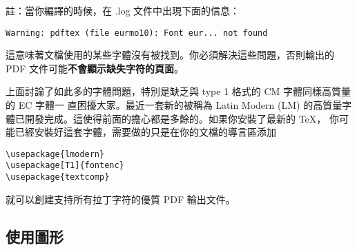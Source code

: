 註：當你編譯的時候，在 .log 文件中出現下面的信息：
\begin{verbatim}
Warning: pdftex (file eurmo10): Font eur... not found
\end{verbatim}
這意味著文檔使用的某些字體沒有被找到。你必須解決這些問題，否則輸出的 PDF 
文件可能\textbf{不會顯示缺失字符的頁面}。


上面討論了如此多的字體問題，特別是缺乏與 type 1 格式的 CM 字體同樣高質量的 EC 字體一
直困擾大家。最近一套新的被稱為  Latin Modern
(LM) 的高質量字體已開發完成。這使得前面的擔心都是多餘的。如果你安裝了最新的 \TeX{}，
你可能已經安裝好這套字體，需要做的只是在你的文檔的導言區添加
\begin{code}
\begin{verbatim}
\usepackage{lmodern}
\usepackage[T1]{fontenc}
\usepackage{textcomp}
\end{verbatim}
\end{code}
就可以創建支持所有拉丁字符的優質 PDF 輸出文件。


\subsection{使用圖形}
\label{ssec:pdfgraph}


